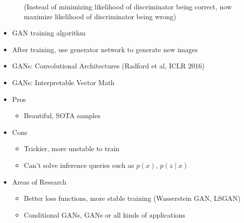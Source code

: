 \begin{itemize}
\begin{itemize}
		(Instead of minimizing likelihood of discriminator being correct, now maximize likelihood of discriminator being wrong)
	\end{itemize}
	\item GAN training algorithm
	\item After training, use generator network to generate new images
	\item GANs: Convolutional Architectures (Radford et al, ICLR 2016)
	\item GANs: Interpretable Vector Math
	\item Pros
	\begin{itemize}
		\item Beautiful, SOTA samples
	\end{itemize}
	\item Cons
	\begin{itemize}
		\item Trickier, more unstable to train
		\item Can't solve inference queries such as $p(x)$, $p(z\mid x)$
	\end{itemize}
	\item Areas of Research
	\begin{itemize}
		\item Better loss functions, more stable training (Wasserstein GAN, LSGAN)
		\item Conditional GANs, GANs or all kinds of applications
	\end{itemize}
\end{itemize}
